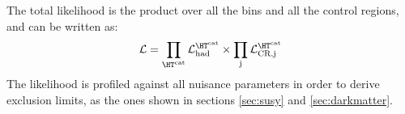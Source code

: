 The total likelihood is the product over all the \htcat bins and all the control regions, and can be written as:
\begin{equation}
\label{eq:total_likelihood}
\mathcal{L} = \prod_{\htcat} \mathcal{L}_{\text{had}}^{\htcat} \times \prod_{\text{j}} \mathcal{L}_{\text{CR,j}}^{\htcat}
\end{equation}
The likelihood is profiled against all nuisance parameters in order to derive exclusion limits, 
as the ones shown in sections \ref{sec:susy} and \ref{sec:darkmatter}. 




